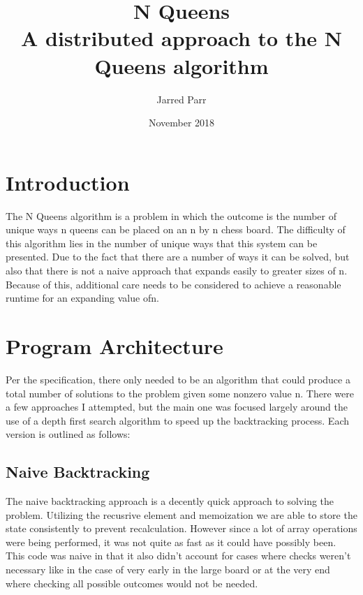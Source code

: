 \documentclass[11pt]{article}
\begin{document}
\title{%
  N Queens \\
  \large A distributed approach to the N Queens algorithm}
\author{Jarred Parr}
\date{November 2018}
\maketitle

\section{Introduction}
The N Queens algorithm is a problem in which the outcome is the number of unique ways n queens can be placed on an n by n
chess board. The difficulty of this algorithm lies in the number of unique ways that this system can be presented. Due to the fact
that there are a number of ways it can be solved, but also that there is not a naive approach that expands easily to greater sizes of n. Because of this, additional care needs to be considered to achieve a reasonable runtime for an expanding value ofn.

\section{Program Architecture}
Per the specification, there only needed to be an algorithm that could produce a total number of solutions to the problem given some nonzero value n. There were a few approaches I attempted, but the main one was focused largely around the use of a depth first search algorithm to speed up the backtracking process. Each version is outlined as follows:

\subsection{Naive Backtracking}
The naive backtracking approach is a decently quick approach to solving the problem. Utilizing the recusrive element and memoization we are able to store the state consistently to prevent recalculation. However since a lot of array operations were being performed, it was not quite as fast as it could have possibly been.
This code was naive in that it also didn't account for cases where checks weren't necessary like in the case of very early in the large board or at the very end where checking all possible outcomes would not be needed.
\end{document}
